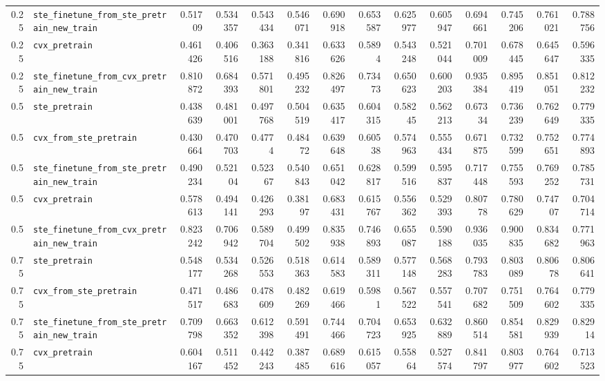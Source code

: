 \begin{longtable}{@{}r l *{12}{r}@{}}
0.25 & \texttt{ste\_finetune\_from\_ste\_pretrain\_new\_train} & 0.51709 & 0.534357 & 0.543434 & 0.546071 & 0.690918 & 0.653587 & 0.625977 & 0.605947 & 0.694661 & 0.745206 & 0.761021 & 0.788756 \\
0.25 & \texttt{cvx\_pretrain} & 0.461426 & 0.406516 & 0.363188 & 0.341816 & 0.633626 & 0.5894 & 0.543248 & 0.521044 & 0.701009 & 0.678445 & 0.645647 & 0.596335 \\
0.25 & \texttt{ste\_finetune\_from\_cvx\_pretrain\_new\_train} & 0.810872 & 0.684393 & 0.571801 & 0.495232 & 0.826497 & 0.73473 & 0.650623 & 0.600203 & 0.935384 & 0.895419 & 0.851051 & 0.812232 \\
0.5 & \texttt{ste\_pretrain} & 0.438639 & 0.481001 & 0.497768 & 0.504519 & 0.635417 & 0.604315 & 0.58245 & 0.562213 & 0.67334 & 0.736239 & 0.762649 & 0.779335 \\
0.5 & \texttt{cvx\_from\_ste\_pretrain} & 0.430664 & 0.470703 & 0.4774 & 0.48472 & 0.639648 & 0.60538 & 0.574963 & 0.555434 & 0.671875 & 0.732599 & 0.752651 & 0.774893 \\
0.5 & \texttt{ste\_finetune\_from\_ste\_pretrain\_new\_train} & 0.490234 & 0.52104 & 0.52367 & 0.540843 & 0.651042 & 0.628817 & 0.599516 & 0.595837 & 0.717448 & 0.755593 & 0.769252 & 0.785731 \\
0.5 & \texttt{cvx\_pretrain} & 0.578613 & 0.494141 & 0.426293 & 0.38197 & 0.683431 & 0.615767 & 0.556362 & 0.529393 & 0.80778 & 0.780629 & 0.74707 & 0.704714 \\
0.5 & \texttt{ste\_finetune\_from\_cvx\_pretrain\_new\_train} & 0.823242 & 0.706942 & 0.589704 & 0.499502 & 0.835938 & 0.746893 & 0.655087 & 0.590188 & 0.936035 & 0.900835 & 0.834682 & 0.771963 \\
0.75 & \texttt{ste\_pretrain} & 0.548177 & 0.534268 & 0.526553 & 0.518363 & 0.614583 & 0.589311 & 0.577148 & 0.568283 & 0.793783 & 0.803089 & 0.80678 & 0.806641 \\
0.75 & \texttt{cvx\_from\_ste\_pretrain} & 0.471517 & 0.486683 & 0.478609 & 0.482269 & 0.619466 & 0.5981 & 0.567522 & 0.557541 & 0.707682 & 0.751509 & 0.764602 & 0.779335 \\
0.75 & \texttt{ste\_finetune\_from\_ste\_pretrain\_new\_train} & 0.709798 & 0.663352 & 0.612398 & 0.591491 & 0.744466 & 0.704723 & 0.653925 & 0.632889 & 0.860514 & 0.854581 & 0.829939 & 0.82914 \\
0.75 & \texttt{cvx\_pretrain} & 0.604167 & 0.511452 & 0.442243 & 0.387485 & 0.689616 & 0.615057 & 0.55864 & 0.527574 & 0.841797 & 0.803977 & 0.764602 & 0.713523 \\

\end{longtable}
